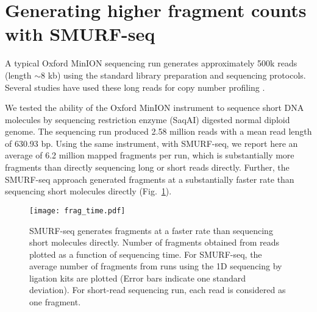 \section{Generating higher fragment counts with SMURF-seq}
A typical Oxford MinION sequencing run generates approximately 500k
reads (length $\sim$8 kb) \citep{jain2018nanopore,tyson2018minion} using
the standard library preparation and sequencing protocols. Several
studies have used these long reads for copy number profiling
\citep{euskirchen2017same,magi2019nano}.

We tested the ability of the Oxford MinION instrument to sequence short
DNA molecules by sequencing restriction enzyme (SaqAI) digested normal
diploid genome.  The sequencing run produced 2.58 million reads with a
mean read length of 630.93 bp.
Using the same instrument, with SMURF-seq, we report here an average of
6.2 million mapped fragments per run, which is substantially more
fragments than directly sequencing long or short reads directly.
Further, the SMURF-seq approach generated fragments at a substantially
faster rate than sequencing short molecules directly
(Fig.~\ref{frag_time}).

\begin{figure}[t!]
\centering
\texttt{[image: frag\_time.pdf]}
\caption[SMURF-seq generates fragments at a faster rate than
  sequencing short molecules directly.]{
  SMURF-seq generates fragments at a faster rate than sequencing
  short molecules directly. Number of fragments obtained from reads
  plotted as a function of  sequencing time. For SMURF-seq, the average
  number of fragments from runs using the 1D sequencing by ligation kits
  are plotted (Error bars indicate one standard deviation). For short-read
  sequencing run, each read is considered as one fragment.}
\label{frag_time}
\end{figure}

